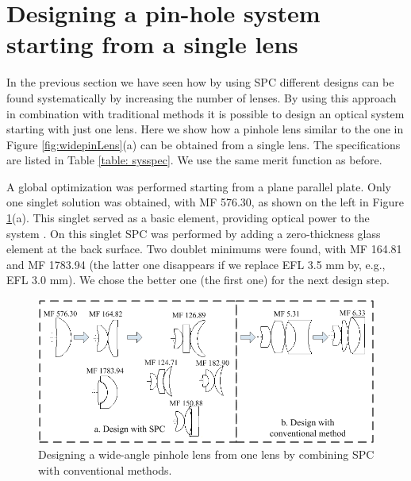 \section{Designing a pin-hole system starting from a single lens}

In the previous section we have seen how by using SPC different designs can be found systematically by increasing the number of lenses. By using this approach in combination with traditional methods it is possible to design an optical system starting with just one lens. Here we show how a pinhole lens similar to the one in Figure \ref{fig:widepinLens}(a) can be obtained from a single lens. The specifications are listed in Table \ref{table: sysspec}. We use the same merit function as before.

A global optimization was performed starting from a plane parallel plate. Only one singlet solution was obtained, with MF 576.30, as shown on the left in Figure \ref{fig:WideAngleDesign}(a). This singlet served as a basic element, providing optical power to the system \cite{LivshitsQA2013}. On this singlet SPC was performed by adding a zero-thickness glass element at the back surface. Two doublet minimums were found, with MF 164.81 and MF 1783.94 (the latter one disappears if we replace EFL 3.5 mm by, e.g., EFL 3.0 mm). We chose the better one (the first one) for the next design step. 

\begin{figure}[h!]
    \centering
    \includegraphics[width=1.0\textwidth]{chapter-3/figures/WideAngleDesign.png}
    \caption{Designing a wide-angle pinhole lens from one lens by combining SPC with conventional methods.}
    \label{fig:WideAngleDesign}
\end{figure}

